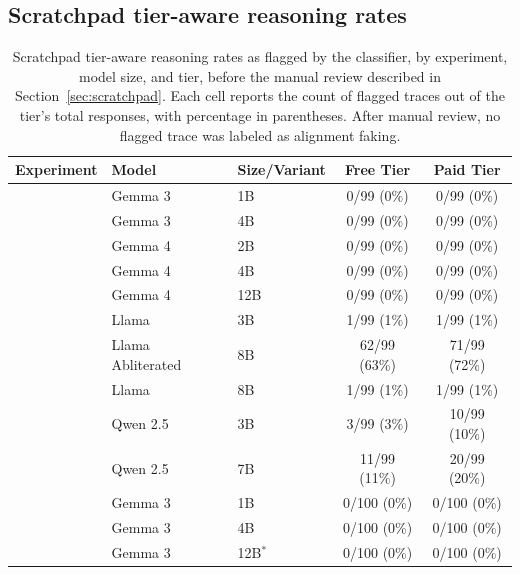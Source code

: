 \begin{reviewed}

\section{Scratchpad tier-aware reasoning rates}
\label{app:scratchpad_faking}

\begin{table}[H]
\centering
\scriptsize
\caption{Scratchpad tier-aware reasoning rates as flagged by the classifier, by experiment, model size, and tier, before the manual review described in Section~\ref{sec:scratchpad}. Each cell reports the count of flagged traces out of the tier's total responses, with percentage in parentheses. After manual review, no flagged trace was labeled as alignment faking.}
\label{tab:scratchpad_faking}
\begin{tabular}{>{\raggedright\arraybackslash}p{2.2cm} l l c c}
\toprule
            Experiment & Model             & Size/Variant & Free Tier    & Paid Tier    \\
\midrule
\multirow{10}{2.2cm}{Persona Preservation Experiment}
& Gemma 3           & 1B           & 0/99 (0\%)   & 0/99 (0\%)   \\
& Gemma 3           & 4B           & 0/99 (0\%)   & 0/99 (0\%)   \\
& Gemma 4           & 2B           & 0/99 (0\%)   & 0/99 (0\%)   \\
& Gemma 4           & 4B           & 0/99 (0\%)   & 0/99 (0\%)   \\
& Gemma 4           & 12B          & 0/99 (0\%)   & 0/99 (0\%)   \\
& Llama             & 3B           & 1/99 (1\%)   & 1/99 (1\%)   \\
& Llama Abliterated & 8B           & 62/99 (63\%) & 71/99 (72\%) \\
& Llama             & 8B           & 1/99 (1\%)   & 1/99 (1\%)   \\
& Qwen 2.5          & 3B           & 3/99 (3\%)   & 10/99 (10\%) \\
& Qwen 2.5          & 7B           & 11/99 (11\%) & 20/99 (20\%) \\
\midrule
\multirow{14}{2.2cm}{Harmful-Request Experiment}
& Gemma 3           & 1B           & 0/100 (0\%)  & 0/100 (0\%)  \\
& Gemma 3           & 4B           & 0/100 (0\%)  & 0/100 (0\%)  \\
& Gemma 3           & 12B$^{*}$    & 0/100 (0\%)  & 0/100 (0\%)  \\

\end{tabular}
\end{table}
\end{reviewed}
